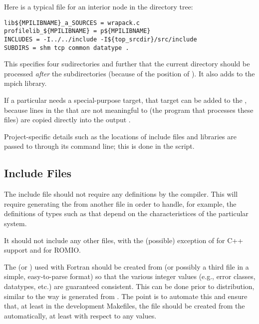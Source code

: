 \documentclass{article}
\begin{document}
Here is a typical  file for an interior node in the
directory tree:
\begin{verbatim}
lib${MPILIBNAME}_a_SOURCES = wrapack.c 
profilelib_${MPILIBNAME} = p${MPILIBNAME}
INCLUDES = -I../../include -I${top_srcdir}/src/include
SUBDIRS = shm tcp common datatype .
\end{verbatim}
This specifies four sudirectories and further that the current directory
should be processed \emph{after} the subdirectories (because of the position
of ).  It also adds  to the mpich library.

If a particular  needs a special-purpose target, that target
can be added to the , because lines in the
 that are not meaningful to  (the
program that processes these 
files) are copied directly into the output .  

Project-specific details such as the locations of include files and libraries
are passed to  through its command line; this is done in the
 script.

\subsection{Include Files}
The include file  should not require any 
definitions by the compiler.  This will require generating the
 from another file in order to handle, for example, the
definitions of types such as  that depend on the
characteristices of the particular system.

It should not include any other
files, with the (possible) exception of  for C++
support and  for ROMIO.

The  (or ) used with Fortran should be
created from 
 (or possibly a third file in a simple, easy-to-parse
format) so that the various integer values (e.g., error classes, 
datatypes, etc.) are guaranteed consistent.  This can be done prior to
distribution, similar to the way  is generated from
.  The point is to automate this and ensure that,
at least in the development Makefiles, the  file
should be created from the  automatically, at least with
respect to any values. 
\end{document}
